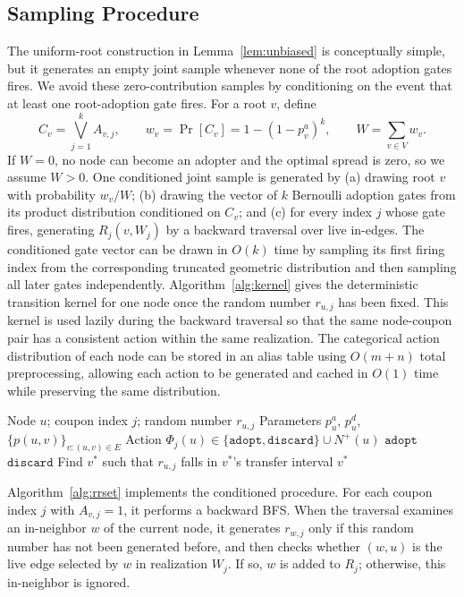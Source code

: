 \documentclass[sigconf,balance=false]{acmart}
\begin{document}
\subsection{Sampling Procedure}

The uniform-root construction in Lemma~\ref{lem:unbiased} is conceptually
simple, but it generates an empty joint sample whenever none of the root
adoption gates fires.
We avoid these zero-contribution samples by conditioning on the event that
at least one root-adoption gate fires.
For a root $v$, define
\[
  C_v=\bigvee_{j=1}^k A_{v,j},\qquad
  w_v=\Pr[C_v]=1-(1-p_v^a)^k,\qquad
  W=\sum_{v\in V}w_v.
\]
If $W=0$, no node can become an adopter and the optimal spread is zero, so we
assume $W>0$.
One conditioned joint sample is generated by (a) drawing root $v$ with
probability $w_v/W$; (b) drawing the vector of $k$ Bernoulli adoption
gates from its product distribution conditioned on $C_v$; and (c) for
every index $j$ whose gate fires,
generating $R_j(v,W_j)$ by a backward traversal over live in-edges.
The conditioned gate vector can be drawn in $O(k)$ time by sampling its
first firing index from the corresponding truncated geometric distribution
and then sampling all later gates independently.
Algorithm~\ref{alg:kernel} gives the deterministic transition kernel
for one node once the random number $r_{u,j}$ has been fixed.
This kernel is used lazily during the backward traversal so that the
same node-coupon pair has a consistent action within the same
realization.
The categorical action distribution of each node can be stored in an alias
table using $O(m+n)$ total preprocessing, allowing each action to be generated
and cached in $O(1)$ time while preserving the same distribution.

\begin{algorithm}[t]
\caption{Single-Node Transition Kernel}
\label{alg:kernel}
\begin{algorithmic}[1]
\Require Node $u$; coupon index $j$; random number $r_{u,j}$
\Require Parameters $p_u^a$, $p_u^d$,
  $\{p(u,v)\}_{v:(u,v)\in E}$
\Ensure Action
  $\Phi_j(u)\in\{\mathtt{adopt},\mathtt{discard}\}\cup N^+(u)$
  \State \Return $\mathtt{adopt}$
  \State \Return $\mathtt{discard}$
\Else
  \State Find $v^*$ such that $r_{u,j}$ falls in $v^*$'s transfer interval
  \State \Return $v^*$
\EndIf
\end{algorithmic}
\end{algorithm}

Algorithm~\ref{alg:rrset} implements the conditioned procedure.
For each coupon index $j$ with $A_{v,j}=1$, it performs a backward BFS.
When the traversal examines an in-neighbor $w$ of the current node, it
generates $r_{w,j}$ only if this random number has not been generated
before, and then checks whether $(w,u)$ is the live edge selected by
$w$ in realization $W_j$.
If so, $w$ is added to $R_j$; otherwise, this in-neighbor is ignored.
\end{document}
